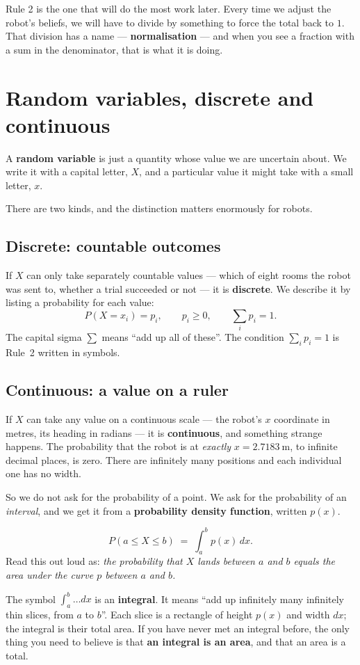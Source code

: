 \documentclass[11pt,a4paper]{report}
\newcommand{\term}[1]{\textcolor{rust}{\textbf{#1}}}
\begin{document}
\begin{keyidea}
Rule 2 is the one that will do the most work later. Every time we adjust the
robot's beliefs, we will have to divide by something to force the total back to
$1$. That division has a name --- \term{normalisation} --- and when you see a
fraction with a sum in the denominator, that is what it is doing.
\end{keyidea}

\section{Random variables, discrete and continuous}

A \term{random variable} is just a quantity whose value we are uncertain
about. We write it with a capital letter, $X$, and a particular value it might
take with a small letter, $x$.

There are two kinds, and the distinction matters enormously for robots.

\subsection{Discrete: countable outcomes}

If $X$ can only take separately countable values --- which of eight rooms the
robot was sent to, whether a trial succeeded or not --- it is \term{discrete}.
We describe it by listing a probability for each value:
\[
P(X = x_i) = p_i, \qquad p_i \ge 0, \qquad \sum_{i} p_i = 1 .
\]
The capital sigma $\sum$ means ``add up all of these''. The condition
$\sum_i p_i = 1$ is Rule~2 written in symbols.

\subsection{Continuous: a value on a ruler}

If $X$ can take any value on a continuous scale --- the robot's $x$ coordinate
in metres, its heading in radians --- it is \term{continuous}, and something
strange happens. The probability that the robot is at \emph{exactly}
$x = \SI{2.7183}{\metre}$, to infinite decimal places, is zero. There are
infinitely many positions and each individual one has no width.

So we do not ask for the probability of a point. We ask for the probability of
an \emph{interval}, and we get it from a \term{probability density function},
written $p(x)$.

\begin{plain}
\[
P(a \le X \le b) \;=\; \int_{a}^{b} p(x)\, dx .
\]
Read this out loud as: \emph{the probability that $X$ lands between $a$ and
$b$ equals the area under the curve $p$ between $a$ and $b$.}

The symbol $\int_a^b \ldots dx$ is an \term{integral}. It means ``add up
infinitely many infinitely thin slices, from $a$ to $b$''. Each slice is a
rectangle of height $p(x)$ and width $dx$; the integral is their total area.
If you have never met an integral before, the only thing you need to believe is
that \textbf{an integral is an area}, and that an area is a total.
\end{plain}
\end{document}
